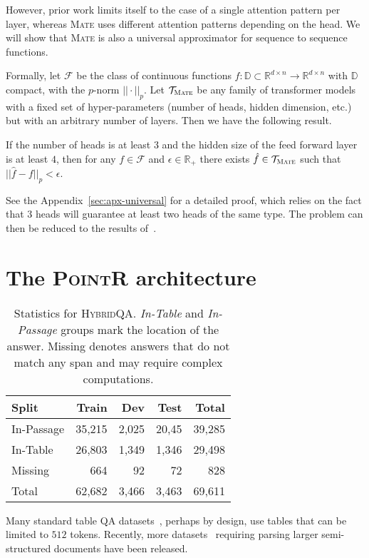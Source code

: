 \documentclass[11pt]{article}
\newcommand\hqa{\textsc{HybridQA}\xspace}
\newcommand{\pointr}{\textsc{PointR}\xspace}
\newcommand{\model}{\textsc{Mate}\xspace}
\begin{document}
However, prior work limits itself to the case of a single attention pattern per layer, whereas \model uses different attention patterns depending on the head. We will show that \model is also a universal approximator for sequence to sequence functions.

Formally, let $\mathcal{F}$ be the class of continuous functions $f:\mathbb{D}\subset \mathbb{R}^{d\times n}\to \mathbb{R}^{d\times n}$
with $\mathbb{D}$ compact, with the $p$-norm $|\!|\cdot|\!|_p$. Let $\mathcal{T}_\model$ be any family of transformer models with a fixed set of hyper-parameters (number of heads, hidden dimension, etc.) but with an arbitrary number of layers. Then we have the following result.

\begin{theorem}
If the number of heads is at least $3$ and the hidden size of the feed forward layer is at least $4$, then for any $f\in \mathcal{F}$ and 
$\epsilon \in \mathbb{R}_+$ 
there exists $\hat{f}\in\mathcal{T}_\model$ such that $|\!|\hat{f} - {f}|\!|_p < \epsilon$.
\label{theo:universal}
\end{theorem}

See the Appendix~\ref{sec:apx-universal} for a detailed proof, which relies on the fact that $3$ heads will guarantee at least two heads of the same type. The problem can then be reduced to the results of~\citet{univapprox2020}.

\section{The \pointr architecture}
\label{sec:pointr}
\begin{table}[t]
\small
\centering
\begin{tabular}{lrrrr}
\toprule
Split & Train & Dev & Test & Total \\
\midrule
In-Passage  &  35,215 & 2,025  & 20,45  & 39,285 \\
In-Table & 26,803 & 1,349 & 1,346 & 29,498 \\
Missing & 664  & 92 & 72 & 828 \\
Total & 62,682 & 3,466 & 3,463 & 69,611 \\
\bottomrule
\end{tabular}
\caption{Statistics for \hqa. \emph{In-Table} and \emph{In-Passage} groups mark the location of the answer. Missing denotes answers that do not match any span and may require complex computations.}
\label{tab:hybridqa_data_split}
\end{table} 
Many standard table QA datasets~\cite{pasupat2015compositional, Chen2020TabFact, iyyer-etal-2017-search}, perhaps by design, use tables that can be limited to $512$ tokens.
Recently, more datasets~\cite{kardas-etal-2020-axcell, talmor2021multimodalqa} requiring parsing larger semi-structured documents have been released.
\end{document}
